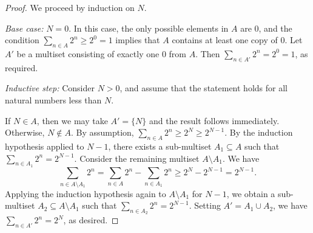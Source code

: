 \documentclass[10pt,a4paper]{amsart}
\begin{document}
\begin{proof}
We proceed by induction on $N$. 

\textit{Base case:} $N = 0$.  
In this case, the only possible elements in $A$ are $0$, and the condition $\sum_{n \in A} 2^n \ge 2^0 = 1$ implies that $A$ contains at least one copy of $0$. Let $A'$ be a multiset consisting of exactly one $0$ from $A$. Then $\sum_{n \in A'} 2^n = 2^0 = 1$, as required.

\textit{Inductive step:} Consider $N > 0$, and assume that the statement holds for all natural numbers less than $N$. 

If $N \in A$, then we may take $A' = \{N\}$ and the result follows immediately. Otherwise, $N \notin A$. By assumption, $\sum_{n \in A} 2^n \ge 2^N \ge 2^{N-1}$. By the induction hypothesis applied to $N-1$, there exists a sub-multiset $A_1 \subseteq A$ such that $\sum_{n \in A_1} 2^n = 2^{N-1}.$ Consider the remaining multiset $A \setminus A_1$. We have 
\[
\sum_{n \in A \setminus A_1} 2^n = \sum_{n \in A} 2^n - \sum_{n \in A_1} 2^n \ge 2^N - 2^{N-1} = 2^{N-1}.
\] 
Applying the induction hypothesis again to $A \setminus A_1$ for $N-1$, we obtain a sub-multiset $A_2 \subseteq A \setminus A_1$ such that $\sum_{n \in A_2} 2^n = 2^{N-1}.$ Setting $A' = A_1 \cup A_2$, we have $\sum_{n \in A'} 2^n = 2^N$, as desired.
\end{proof}
\end{document}
